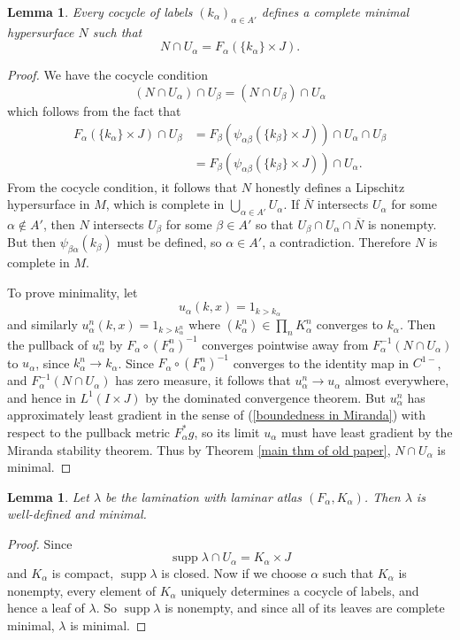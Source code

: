 \documentclass[reqno,11pt]{amsart}
\DeclareMathOperator{\supp}{supp}
\newtheorem{lemma}[theorem]{Lemma}
\theoremstyle{definition}
\numberwithin{equation}{section}
\begin{document}
\begin{lemma}
	Every cocycle of labels $(k_\alpha)_{\alpha \in A'}$ defines a complete minimal hypersurface $N$ such that
	$$N \cap U_\alpha = F_\alpha(\{k_\alpha\} \times J).$$
\end{lemma}
\begin{proof}
We have the cocycle condition
$$(N \cap U_\alpha) \cap U_\beta = (N \cap U_\beta) \cap U_\alpha$$
which follows from the fact that
\begin{align*}
F_\alpha(\{k_\alpha\} \times J) \cap U_\beta
&= F_\beta(\psi_{\alpha \beta}(\{k_\beta\} \times J)) \cap U_\alpha \cap U_\beta \\
&= F_\beta(\psi_{\alpha \beta}(\{k_\beta\} \times J)) \cap U_\alpha.
\end{align*}
From the cocycle condition, it follows that $N$ honestly defines a Lipschitz hypersurface in $M$, which is complete in $\bigcup_{\alpha \in A'} U_\alpha$.
If $\overline N$ intersects $U_\alpha$ for some $\alpha \notin A'$, then $N$ intersects $U_\beta$ for some $\beta \in A'$ so that $U_\beta \cap U_\alpha \cap \overline N$ is nonempty.
But then $\psi_{\beta \alpha}(k_\beta)$ must be defined, so $\alpha \in A'$, a contradiction.
Therefore $N$ is complete in $M$.

To prove minimality, let
$$u_\alpha(k, x) = 1_{k > k_\alpha}$$
and similarly $u_\alpha^n(k, x) = 1_{k > k_\alpha^n}$ where $(k_\alpha^n) \in \prod_n K_\alpha^n$ converges to $k_\alpha$.
Then the pullback of $u_\alpha^n$ by $F_\alpha \circ (F_\alpha^n)^{-1}$ converges pointwise away from $F_\alpha^{-1}(N \cap U_\alpha)$ to $u_\alpha$, since $k_\alpha^n \to k_\alpha$.
Since $F_\alpha \circ (F_\alpha^n)^{-1}$ converges to the identity map in $C^{1-}$, and $F_\alpha^{-1}(N \cap U_\alpha)$ has zero measure, it follows that $u_\alpha^n \to u_\alpha$ almost everywhere, and hence in $L^1(I \times J)$ by the dominated convergence theorem.
But $u_\alpha^n$ has approximately least gradient in the sense of (\ref{boundedness in Miranda}) with respect to the pullback metric $F_\alpha^* g$, so its limit $u_\alpha$ must have least gradient by the Miranda stability theorem.
Thus by Theorem \ref{main thm of old paper}, $N \cap U_\alpha$ is minimal.
\end{proof}

\begin{lemma}
	Let $\lambda$ be the lamination with laminar atlas $(F_\alpha, K_\alpha)$.
	Then $\lambda$ is well-defined and minimal.
\end{lemma}
\begin{proof}
Since 
$$\supp \lambda \cap U_\alpha = K_\alpha \times J$$
and $K_\alpha$ is compact, $\supp \lambda$ is closed.
Now if we choose $\alpha$ such that $K_\alpha$ is nonempty, every element of $K_\alpha$ uniquely determines a cocycle of labels, and hence a leaf of $\lambda$.
So $\supp \lambda$ is nonempty, and since all of its leaves are complete minimal, $\lambda$ is minimal.
\end{proof}
\end{document}
